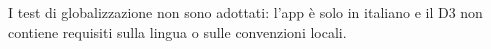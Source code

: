 I test di globalizzazione non sono adottati: l'app è solo in italiano e il D3 non contiene requisiti sulla lingua o sulle convenzioni locali.



